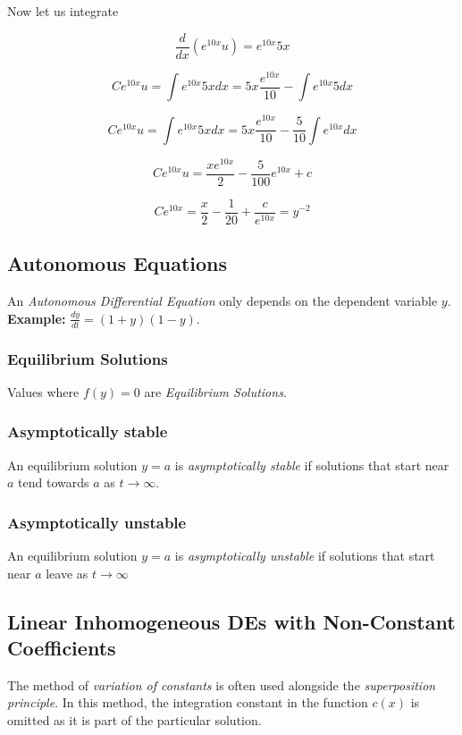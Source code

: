 Now let us integrate

\[
    \frac{d}{dx} \left(e^{10x}u\right) = e^{10x}5x
\]

\[
    Ce^{10x}u = \int e^{10x} 5x dx = 5x \frac{e^{10x}}{10} - \int e^{10x}5dx
\]

\[
    Ce^{10x}u = \int e^{10x} 5x dx = 5x \frac{e^{10x}}{10} - \frac{5}{10}\int e^{10x}dx
\]

\[
    Ce^{10x}u = \frac{xe^{10x}}{2} - \frac{5}{100} e^{10x} + c
\]

\[
    Ce^{10x} = \frac{x}{2} - \frac{1}{20} + \frac{c}{e^{10x}} = y^{-2}
\]

\subsection{Autonomous Equations}

An \emph{Autonomous Differential Equation} only depends on the dependent
variable \(y\).\textbf{ Example: } \(\frac{dy}{dt} = (1 + y)(1 -y)\).

\subsubsection{Equilibrium Solutions}

Values where \(f(y) = 0\) are \emph{Equilibrium Solutions}.

\subsubsection*{Asymptotically stable}

An equilibrium solution \(y = a\) is \emph{asymptotically stable} if solutions
that start near \(a\) tend towards \(a\) as \(t \to \infty\).

\subsubsection*{Asymptotically unstable}

An equilibrium solution \(y = a\) is \emph{asymptotically unstable} if solutions
that start near \(a\) leave as \(t \to \infty\)

\subsection{Linear Inhomogeneous DEs with Non-Constant Coefficients}

The method of \emph{variation of constants} is often used alongside the \emph{superposition principle}. 
In this method, the integration constant in the function \( c(x) \) is omitted as it is part of the 
particular solution.

